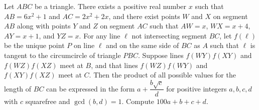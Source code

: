 Let $ABC$ be a triangle. There exists a positive real number $x$ such that $AB=6x^2+1$ and $AC = 2x^2+2x$, and there exist points $W$ and $X$ on segment $AB$ along with points $Y$ and $Z$ on segment $AC$ such that $AW=x$, $WX=x+4$, $AY=x+1$, and $YZ=x$. For any line $\ell$ not intersecting segment $BC$, let $f(\ell)$ be the unique point $P$ on line $\ell$ and on the same side of $BC$ as $A$ such that $\ell$ is tangent to the circumcircle of triangle $PBC$. Suppose lines $f(WY)f(XY)$ and $f(WZ)f(XZ)$ meet at $B$, and that lines $f(WZ)f(WY)$ and $f(XY)f(XZ)$ meet at $C$. Then the product of all possible values for the length of $BC$ can be expressed in the form $a + \dfrac{b\sqrt{c}}{d}$ for positive integers $a,b,c,d$ with $c$ squarefree and $\gcd (b,d)=1$. Compute $100a+b+c+d$.
